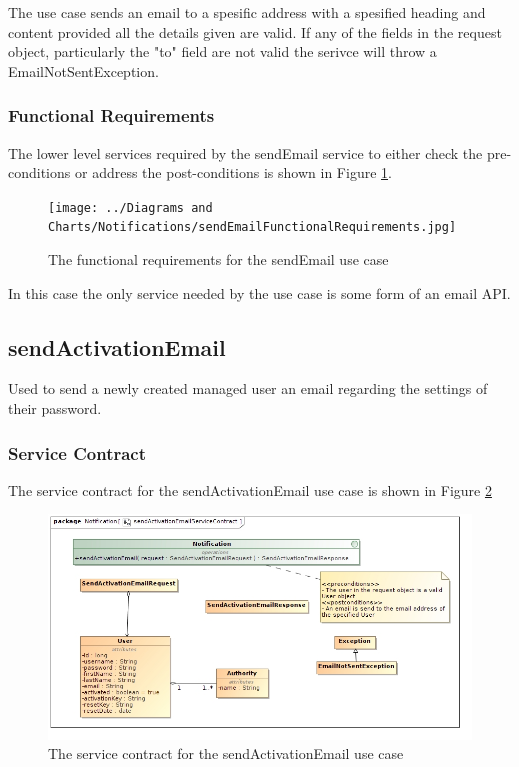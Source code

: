 The use case sends an email to a spesific address with a spesified heading and content
provided all the details given are valid. If any of the fields in the request object,
particularly the "to" field are not valid the serivce will throw a EmailNotSentException.

\subsubsection{Functional Requirements}
The lower level services required by the sendEmail service to either check the
pre-conditions or address the post-conditions is shown in Figure
\ref{sendEmailFunctionalRequirements}.
\begin{figure}[H]
	\begin{center}
		\texttt{[image: ../Diagrams and Charts/Notifications/sendEmailFunctionalRequirements.jpg]}
		\caption{The functional requirements for the sendEmail use case}
	\end{center}
	\label{sendEmailFunctionalRequirements}
\end{figure}

In this case the only service needed by the use case is some form of an email
API.

\subsection{sendActivationEmail}
Used to send a newly created managed user an email regarding the settings of
their password.

\subsubsection{Service Contract}
The service contract for the sendActivationEmail use case is shown in Figure \ref{sendActivationEmailServiceContract}
\begin{figure}[H]
	\begin{center}
		\includegraphics[scale=0.5]{../Diagrams and Charts/Notifications/sendActivationEmailServiceContract.jpg}
		\caption{The service contract for the sendActivationEmail use case}
	\end{center}
	\label{sendActivationEmailServiceContract}
\end{figure}

